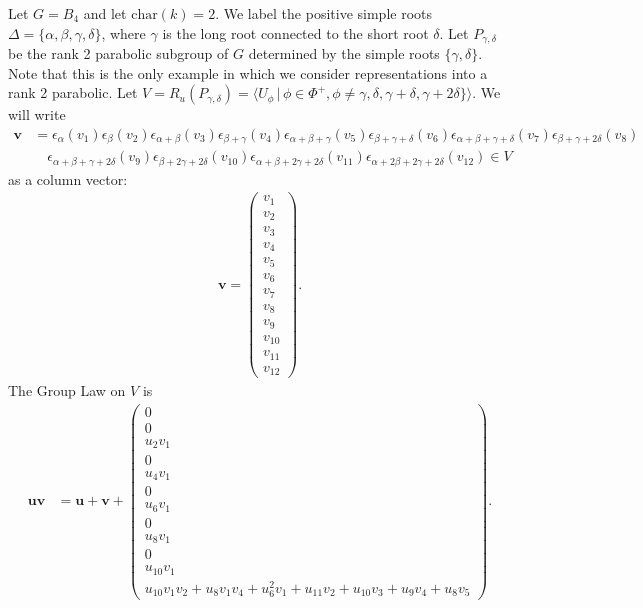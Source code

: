 	Let $G = B_4$ and let $\mathrm{char}(k)=2$. We label the positive simple roots $\Delta = \{\alpha, \beta, \gamma, \delta\}$, where $\gamma$ is the long root connected to the short root $\delta$. Let $P_{\gamma, \delta}$ be the rank 2 parabolic subgroup of $G$ determined by the simple roots $\{\gamma, \delta\}$. Note that this is the only example in which we consider representations into a rank 2 parabolic. Let $V=R_u(P_{\gamma, \delta}) = \langle U_\phi\, |\, \phi \in \Phi^+, \phi \neq \gamma, \delta, \gamma + \delta, \gamma+2\delta\} \rangle$. We will write
\begin{align*}
\mathbf{v} &= \epsilon_\alpha(v_1) \epsilon_\beta(v_2) \epsilon_{\alpha+\beta}(v_3) \epsilon_{\beta+\gamma}(v_4) \epsilon_{\alpha+\beta+\gamma}(v_5) \epsilon_{\beta+\gamma+\delta}(v_6) \epsilon_{\alpha+\beta+\gamma+\delta}(v_7) \epsilon_{\beta+\gamma+2\delta}(v_8)\\ 
&\quad\epsilon_{\alpha+\beta+\gamma+2\delta}(v_9)\epsilon_{\beta+2\gamma+2\delta}(v_{10}) \epsilon_{\alpha+\beta+2\gamma+2\delta}(v_{11}) \epsilon_{\alpha+2\beta+2\gamma+2\delta}(v_{12}) \in V
\end{align*}
as a column vector:
\begin{align*}
\mathbf{v} = \left( \begin{matrix}
	         v_1 \\
	         v_2 \\
	         v_3 \\
	         v_4 \\
	         v_5 \\
	         v_6 \\
	         v_7 \\
	         v_8 \\
	         v_9 \\
	         v_{10} \\
	         v_{11} \\
	         v_{12} 
	      \end{matrix}\right). 
\end{align*}
The Group Law on $V$ is
\begin{align*}
	     \mathbf{u}
	     \mathbf{v}&=
	     \mathbf{u} + \mathbf{v} +
	     \left( \begin{matrix}
	         0 \\
	         0 \\
	         u_2v_1\\
	         0 \\
	         u_4v_1 \\
	         0 \\
	         u_6v_1\\
	         0 \\
	         u_8v_1\\
	         0 \\
	         u_{10}v_1\\
	         u_{10}v_1v_2 + u_8v_1v_4 + u_6^2v_1 + u_{11}v_2 + u_{10}v_3 + u_9v_4 + u_8v_5
	         	\end{matrix}\right).
\end{align*}

